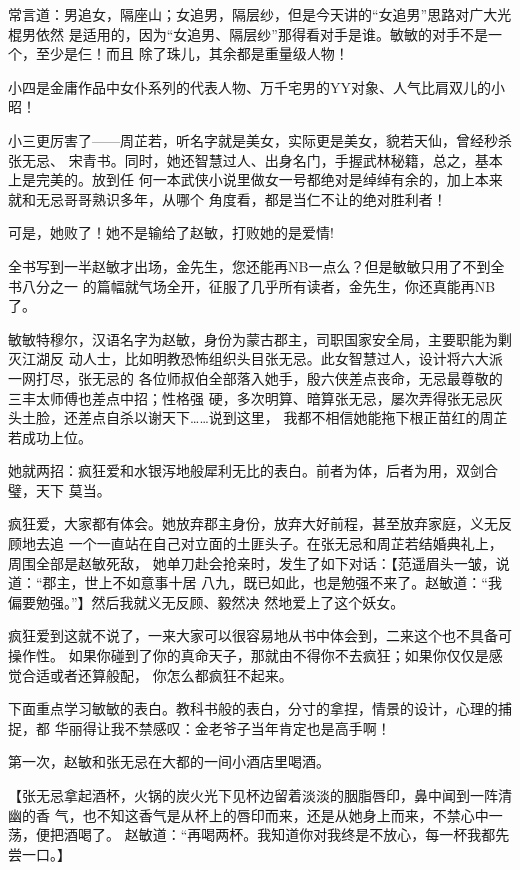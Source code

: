 \documentclass[11pt]{article}
\begin{document}
常言道：男追女，隔座山；女追男，隔层纱，但是今天讲的“女追男”思路对广大光棍男依然
是适用的，因为“女追男、隔层纱”那得看对手是谁。敏敏的对手不是一个，至少是仨！而且
除了珠儿，其余都是重量级人物！

小四是金庸作品中女仆系列的代表人物、万千宅男的YY对象、人气比肩双儿的小昭！

 小三更厉害了——周芷若，听名字就是美女，实际更是美女，貌若天仙，曾经秒杀张无忌、
宋青书。同时，她还智慧过人、出身名门，手握武林秘籍，总之，基本上是完美的。放到任
何一本武侠小说里做女一号都绝对是绰绰有余的，加上本来就和无忌哥哥熟识多年，从哪个
角度看，都是当仁不让的绝对胜利者！

可是，她败了！她不是输给了赵敏，打败她的是爱情!

全书写到一半赵敏才出场，金先生，您还能再NB一点么？但是敏敏只用了不到全书八分之一
的篇幅就气场全开，征服了几乎所有读者，金先生，你还真能再NB了。

敏敏特穆尔，汉语名字为赵敏，身份为蒙古郡主，司职国家安全局，主要职能为剿灭江湖反
动人士，比如明教恐怖组织头目张无忌。此女智慧过人，设计将六大派一网打尽，张无忌的
各位师叔伯全部落入她手，殷六侠差点丧命，无忌最尊敬的三丰太师傅也差点中招；性格强
硬，多次明算、暗算张无忌，屡次弄得张无忌灰头土脸，还差点自杀以谢天下……说到这里，
我都不相信她能拖下根正苗红的周芷若成功上位。

 她就两招：疯狂爱和水银泻地般犀利无比的表白。前者为体，后者为用，双剑合璧，天下
莫当。

疯狂爱，大家都有体会。她放弃郡主身份，放弃大好前程，甚至放弃家庭，义无反顾地去追
一个一直站在自己对立面的土匪头子。在张无忌和周芷若结婚典礼上，周围全部是赵敏死敌，
她单刀赴会抢亲时，发生了如下对话：【范遥眉头一皱，说道：“郡主，世上不如意事十居
八九，既已如此，也是勉强不来了。赵敏道：“我偏要勉强。”】然后我就义无反顾、毅然决
然地爱上了这个妖女。

 疯狂爱到这就不说了，一来大家可以很容易地从书中体会到，二来这个也不具备可操作性。
如果你碰到了你的真命天子，那就由不得你不去疯狂；如果你仅仅是感觉合适或者还算般配，
你怎么都疯狂不起来。

 下面重点学习敏敏的表白。教科书般的表白，分寸的拿捏，情景的设计，心理的捕捉，都
华丽得让我不禁感叹：金老爷子当年肯定也是高手啊！

第一次，赵敏和张无忌在大都的一间小酒店里喝酒。

 【张无忌拿起酒杯，火锅的炭火光下见杯边留着淡淡的胭脂唇印，鼻中闻到一阵清幽的香
气，也不知这香气是从杯上的唇印而来，还是从她身上而来，不禁心中一荡，便把酒喝了。
赵敏道：“再喝两杯。我知道你对我终是不放心，每一杯我都先尝一口。】
\end{document}
